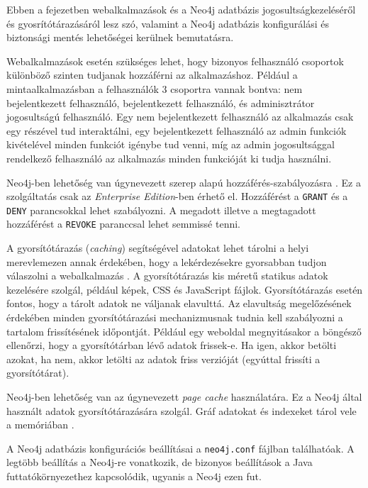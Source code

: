
Ebben a fejezetben webalkalmazások és a Neo4j adatbázis jogosultságkezeléséről és gyosrítótárazásáról lesz szó, valamint a Neo4j adatbázis konfigurálási és biztonsági mentés lehetőségei kerülnek bemutatásra.


Webalkalmazások esetén szükséges lehet, hogy bizonyos felhasználó csoportok különböző szinten tudjanak hozzáférni az alkalmazáshoz. Például a mintaalkalmazásban a felhasználók 3 csoportra vannak bontva: nem bejelentkezett felhasználó, bejelentkezett  felhasználó, és adminisztrátor jogosultságú felhasználó. Egy nem bejelentkezett felhasználó az alkalmazás csak egy részével tud interaktálni, egy bejelentkezett felhasználó az admin funkciók kivételével minden funkciót igénybe tud venni, míg az admin jogosultsággal rendelkező felhasználó az alkalmazás minden funkcióját ki tudja használni.

Neo4j-ben lehetőség van úgynevezett szerep alapú hozzáférés-szabályozásra \cite{neo4j-privileges}. Ez a szolgáltatás csak az \textit{Enterprise Edition}-ben érhető el. Hozzáférést a \texttt{GRANT} és a \texttt{DENY} parancsokkal lehet szabályozni. A megadott illetve a megtagadott hozzáférést a \texttt{REVOKE} paranccsal lehet semmissé tenni. 


A gyorsítótárazás (\textit{caching}) segítségével adatokat lehet tárolni a helyi merevlemezen annak érdekében, hogy a lekérdezésekre gyorsabban tudjon válaszolni a webalkalmazás \cite{cache}. A gyorsítótárazás kis méretű statikus adatok kezelésére szolgál, például képek, CSS és JavaScript fájlok. Gyorsítótárazás esetén fontos, hogy a tárolt adatok ne váljanak elavulttá. Az elavultság megelőzésének érdekében minden gyorsítótárazási mechanizmusnak tudnia kell szabályozni a tartalom frissítésének időpontját. Például egy weboldal megnyitásakor a böngésző ellenőrzi, hogy a gyorsítótárban lévő adatok frissek-e. Ha igen, akkor betölti azokat, ha nem, akkor letölti az adatok friss verzióját (egyúttal frissíti a gyorsítótárat).

Neo4j-ben lehetőség van az úgynevezett \textit{page cache} használatára. Ez a Neo4j által használt adatok gyorsítótárazására szolgál. Gráf adatokat és indexeket tárol vele a memóriában \cite{neo4j-page-cache}.


A Neo4j adatbázis konfigurációs beállításai a \texttt{neo4j.conf} fájlban találhatóak. A legtöbb beállítás a Neo4j-re vonatkozik, de bizonyos beállítások a Java futtatókörnyezethez kapcsolódik, ugyanis a Neo4j ezen fut.

